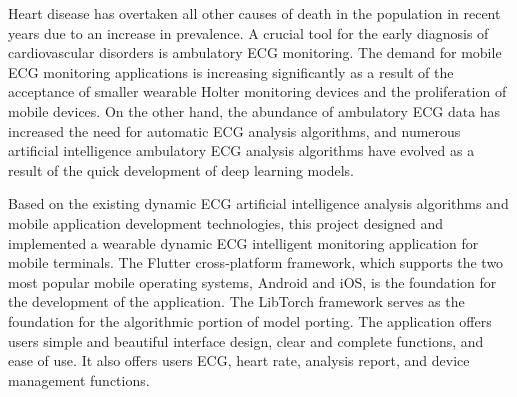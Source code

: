\begin{abstractEN}

    Heart disease has overtaken all other causes of death in the population in recent years due to an increase in prevalence.
    A crucial tool for the early diagnosis of cardiovascular disorders is ambulatory ECG monitoring.
    The demand for mobile ECG monitoring applications is increasing significantly as a result of the acceptance of smaller wearable Holter monitoring devices and the proliferation of mobile devices.
    On the other hand, the abundance of ambulatory ECG data has increased the need for automatic ECG analysis algorithms, and numerous artificial intelligence ambulatory ECG analysis algorithms have evolved as a result of the quick development of deep learning models.

    Based on the existing dynamic ECG artificial intelligence analysis algorithms and mobile application development technologies, this project designed and implemented a wearable dynamic ECG intelligent monitoring application for mobile terminals.
    The Flutter cross-platform framework, which supports the two most popular mobile operating systems, Android and iOS, is the foundation for the development of the application.
    The LibTorch framework serves as the foundation for the algorithmic portion of model porting.
    The application offers users simple and beautiful interface design, clear and complete functions, and ease of use.
    It also offers users ECG, heart rate, analysis report, and device management functions.

\end{abstractEN}
